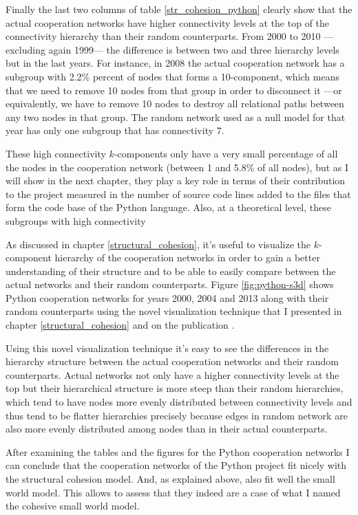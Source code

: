 Finally the last two columns of table \ref{str_cohesion_python} clearly show that the actual cooperation networks have higher connectivity levels at the top of the connectivity hierarchy than their random counterparts. From 2000 to 2010 ---excluding again 1999--- the difference is between two and three hierarchy levels but in the last years. For instance, in 2008 the actual cooperation network has a subgroup with 2.2\% percent of nodes that forms a 10-component, which means that we need to remove 10 nodes from that group in order to disconnect it ---or equivalently, we have to remove 10 nodes to destroy all relational paths between any two nodes in that group. The random network used as a null model for that year has only one subgroup that has connectivity 7.

These high connectivity $k$-components only have a very small percentage of all the nodes in the cooperation network (between 1 and 5.8\% of all nodes), but as I will show in the next chapter, they play a key role in terms of their contribution to the project measured in the number of source code lines added to the files that form the code base of the Python language. Also, at a theoretical level, these subgroups with high connectivity 

As discussed in chapter \ref{structural_cohesion}, it's useful to visualize the $k$-component hierarchy of the cooperation networks in order to gain a better understanding of their structure and to be able to easily compare between the actual networks and their random counterparts. Figure \ref{fig:python-s3d} shows Python cooperation networks for years 2000, 2004 and 2013 along with their random counterparts using the novel visualization technique that I presented in chapter \ref{structural_cohesion} and on the publication \citep{torrents:2015}.

Using this novel visualization technique it's easy to see the differences in the hierarchy structure between the actual cooperation networks and their random counterparts. Actual networks not only have a higher connectivity levels at the top but their hierarchical structure is more steep than their random hierarchies, which tend to have nodes more evenly distributed between connectivity levels and thus tend to be flatter hierarchies precisely because edges in random network are also more evenly distributed among nodes than in their actual counterparts.

After examining the tables and the figures for the Python cooperation networks I can conclude that the cooperation networks of the Python project fit nicely with the structural cohesion model. And, as explained above, also fit well the small world model. This allows to assess that they indeed are a case of what I named the cohesive small world model.

